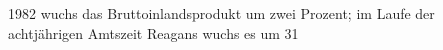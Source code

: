 \documentclass{article}
\begin{document}

1982 wuchs das Bruttoinlandsprodukt um zwei Prozent; im Laufe der achtjährigen Amtszeit Reagans wuchs es um 31%
\end{document}
